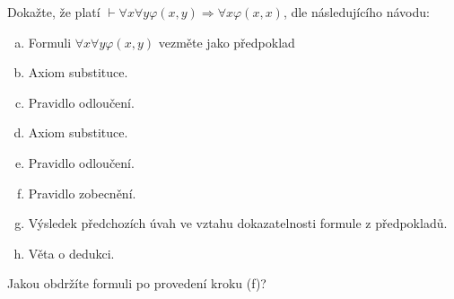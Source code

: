 Dokažte, že platí $\vdash \forall x \forall y \varphi(x,y) \Rightarrow \forall x
\varphi (x,x)$, dle následujícího návodu:
\begin{enumerate}[(a)]
  \item Formuli $\forall x \forall y \varphi (x,y)$ vezměte jako předpoklad
  \item Axiom substituce.
  \item Pravidlo odloučení.
  \item Axiom substituce.
  \item Pravidlo odloučení.
  \item Pravidlo zobecnění.
  \item Výsledek předchozích úvah ve vztahu dokazatelnosti formule z
  předpokladů.
  \item Věta o dedukci.
\end{enumerate}
Jakou obdržíte formuli po provedení kroku (f)?
